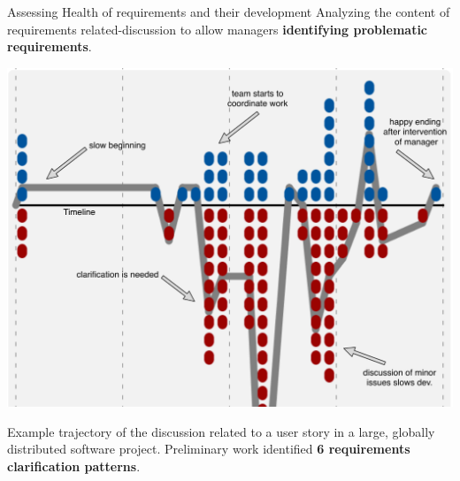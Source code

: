 \documentclass[final]{beamer} %
\newcommand{\marker}[1]{\textbf{\color{knaccentcolor1} #1}}
\begin{document}
\begin{frame}{}
\begin{columns}[t]
\begin{column}{.45\linewidth}
  \vspace{2\columnsep}

    \begin{block}{Assessing Health of requirements and their development}
    Analyzing the content of requirements related-discussion to allow managers \marker{identifying problematic requirements}.
        \vspace{2\columnsep}
\begin{center}
\includegraphics[viewport=0 0 625 475,clip=true,width=0.9\linewidth]{img/bike-shed-example}\\
\vspace{-0.5cm}
\end{center}


Example trajectory of the discussion related to a user story in a large, globally distributed software project. Preliminary work identified \marker{6 requirements clarification patterns}.
    \end{block}
   


\end{column}
\end{columns}
\end{frame}
\end{document}
